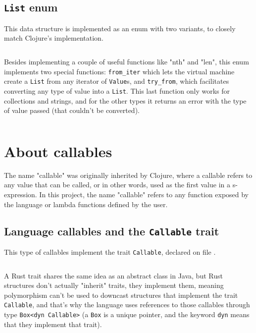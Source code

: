 \documentclass[11pt]{scrreprt}
\begin{document}
\section{\texttt{List} enum}
This data structure is implemented as an enum with two variants, to closely match Clojure's implementation.

\inputminted[firstline=8,lastline=13]{rust}{/home/mario/git/MarioJim/miniclj/miniclj-lib/src/vm/list.rs}

Besides implementing a couple of useful functions like "nth" and "len", this enum implements two special functions: \texttt{from\_iter} which lets the virtual machine create a \texttt{List} from any iterator of \texttt{Value}s, and \texttt{try\_from}, which facilitates converting any type of value into a \texttt{List}. This last function only works for collections and strings, and for the other types it returns an error with the type of value passed (that couldn't be converted).

\inputminted[firstline=92,lastline=121]{rust}{/home/mario/git/MarioJim/miniclj/miniclj-lib/src/vm/list.rs}


\chapter{About callables}
The name "callable" was originally inherited by Clojure, where a callable refers to any value that can be called, or in other words, used as the first value in a s-expression. In this project, the name "callable" refers to any function exposed by the language or lambda functions defined by the user.

\section{Language callables and the \texttt{Callable} trait}
This type of callables implement the trait \texttt{Callable}, declared on file .

\inputminted[firstline=12,lastline=45,breaklines=true]{rust}{/home/mario/git/MarioJim/miniclj/miniclj-lib/src/callables/callable.rs}

A Rust trait shares the same idea as an abstract class in Java, but Rust structures don't actually "inherit" traits, they implement them, meaning polymorphism can't be used to downcast structures that implement the trait \texttt{Callable}, and that's why the language uses references to those callables through type \texttt{Box<dyn Callable>} (a \texttt{Box} is a unique pointer, and the keyword \texttt{dyn} means that they implement that trait).
\end{document}

